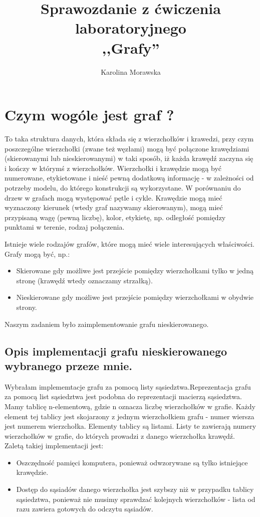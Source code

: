\documentclass[11pt]{article} %
\title{Sprawozdanie z ćwiczenia laboratoryjnego \\,,Grafy''}
\author{Karolina Morawska}
\begin{document}
\maketitle
\newpage
\section{Czym wogóle jest graf ?}
 To taka struktura danych, która składa się z wierzchołków i krawedzi, przy czym poszczególne wierzchołki (zwane też węzłami) mogą być połączone krawędziami (skierowanymi lub nieskierowanymi) w taki sposób, iż każda krawędź zaczyna się i kończy w którymś z wierzchołków. Wierzchołki i krawędzie mogą być numerowane, etykietowane i nieść pewną dodatkową informację - w zależności od potrzeby modelu, do którego konstrukcji są wykorzystane. W porównaniu do drzew w grafach mogą występować pętle i cykle. Krawędzie mogą mieć wyznaczony kierunek (wtedy graf nazywamy skierowanym), mogą mieć przypisaną wagę (pewną liczbę), kolor, etykietę, np. odległość pomiędzy punktami w terenie, rodzaj połączenia.


Istnieje wiele rodzajów grafów, które mogą mieć wiele interesujących właściwości. Grafy mogą być, np.:

\begin{itemize}
\item Skierowane gdy możliwe jest przejście pomiędzy wierzchołkami tylko w jedną stronę (krawędź wtedy oznaczamy strzałką).
\item Nieskierowane gdy możliwe jest przejście pomiędzy wierzchołkami w obydwie strony.
\end{itemize}
Naszym zadaniem było zaimplementowanie grafu nieskierowanego.
\subsection{Opis implementacji grafu nieskierowanego wybranego przeze mnie.}

Wybrałam implememtacje grafu za pomocą listy sąsiedztwa.Reprezentacja grafu za pomocą list sąsiedztwa jest podobna do reprezentacji macierzą sąsiedztwa. Mamy tablicę n-elementową, gdzie n oznacza liczbę wierzchołków w grafie. Każdy element tej tablicy jest skojarzony z jednym wierzchołkiem grafu - numer wiersza jest numerem wierzchołka. Elementy tablicy są listami. Listy te zawierają numery wierzchołków w grafie, do których prowadzi z danego wierzchołka krawędź.
\\Zaletą takiej implementacji jest:
\begin{itemize}
\item  Oszczędność pamięci komputera, ponieważ odwzorywane są  tylko istniejące krawędzie.
\item Dostęp do sąsiadów danego wierzchołka jest szybszy niż w przypadku tablicy sąsiedztwa, ponieważ nie musimy sprawdzać kolejnych wierzchołków - lista od razu zawiera gotowych do odczytu sąsiadów.
\end{itemize}
\newpage
\end{document}
